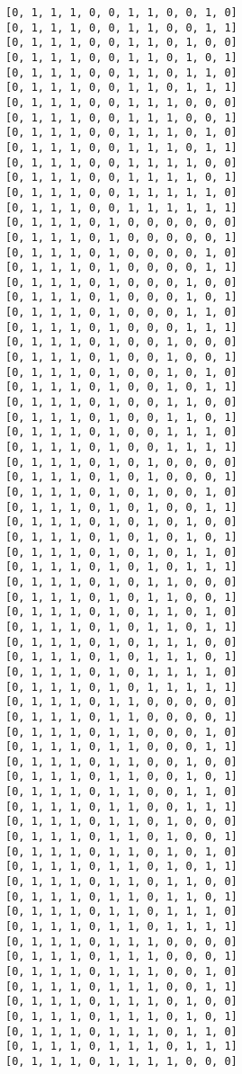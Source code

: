 \documentclass[11pt]{article}
\begin{document}
\begin{Verbatim}[commandchars=\\\{\}]
[0, 1, 1, 1, 0, 0, 1, 1, 0, 0, 1, 0]
[0, 1, 1, 1, 0, 0, 1, 1, 0, 0, 1, 1]
[0, 1, 1, 1, 0, 0, 1, 1, 0, 1, 0, 0]
[0, 1, 1, 1, 0, 0, 1, 1, 0, 1, 0, 1]
[0, 1, 1, 1, 0, 0, 1, 1, 0, 1, 1, 0]
[0, 1, 1, 1, 0, 0, 1, 1, 0, 1, 1, 1]
[0, 1, 1, 1, 0, 0, 1, 1, 1, 0, 0, 0]
[0, 1, 1, 1, 0, 0, 1, 1, 1, 0, 0, 1]
[0, 1, 1, 1, 0, 0, 1, 1, 1, 0, 1, 0]
[0, 1, 1, 1, 0, 0, 1, 1, 1, 0, 1, 1]
[0, 1, 1, 1, 0, 0, 1, 1, 1, 1, 0, 0]
[0, 1, 1, 1, 0, 0, 1, 1, 1, 1, 0, 1]
[0, 1, 1, 1, 0, 0, 1, 1, 1, 1, 1, 0]
[0, 1, 1, 1, 0, 0, 1, 1, 1, 1, 1, 1]
[0, 1, 1, 1, 0, 1, 0, 0, 0, 0, 0, 0]
[0, 1, 1, 1, 0, 1, 0, 0, 0, 0, 0, 1]
[0, 1, 1, 1, 0, 1, 0, 0, 0, 0, 1, 0]
[0, 1, 1, 1, 0, 1, 0, 0, 0, 0, 1, 1]
[0, 1, 1, 1, 0, 1, 0, 0, 0, 1, 0, 0]
[0, 1, 1, 1, 0, 1, 0, 0, 0, 1, 0, 1]
[0, 1, 1, 1, 0, 1, 0, 0, 0, 1, 1, 0]
[0, 1, 1, 1, 0, 1, 0, 0, 0, 1, 1, 1]
[0, 1, 1, 1, 0, 1, 0, 0, 1, 0, 0, 0]
[0, 1, 1, 1, 0, 1, 0, 0, 1, 0, 0, 1]
[0, 1, 1, 1, 0, 1, 0, 0, 1, 0, 1, 0]
[0, 1, 1, 1, 0, 1, 0, 0, 1, 0, 1, 1]
[0, 1, 1, 1, 0, 1, 0, 0, 1, 1, 0, 0]
[0, 1, 1, 1, 0, 1, 0, 0, 1, 1, 0, 1]
[0, 1, 1, 1, 0, 1, 0, 0, 1, 1, 1, 0]
[0, 1, 1, 1, 0, 1, 0, 0, 1, 1, 1, 1]
[0, 1, 1, 1, 0, 1, 0, 1, 0, 0, 0, 0]
[0, 1, 1, 1, 0, 1, 0, 1, 0, 0, 0, 1]
[0, 1, 1, 1, 0, 1, 0, 1, 0, 0, 1, 0]
[0, 1, 1, 1, 0, 1, 0, 1, 0, 0, 1, 1]
[0, 1, 1, 1, 0, 1, 0, 1, 0, 1, 0, 0]
[0, 1, 1, 1, 0, 1, 0, 1, 0, 1, 0, 1]
[0, 1, 1, 1, 0, 1, 0, 1, 0, 1, 1, 0]
[0, 1, 1, 1, 0, 1, 0, 1, 0, 1, 1, 1]
[0, 1, 1, 1, 0, 1, 0, 1, 1, 0, 0, 0]
[0, 1, 1, 1, 0, 1, 0, 1, 1, 0, 0, 1]
[0, 1, 1, 1, 0, 1, 0, 1, 1, 0, 1, 0]
[0, 1, 1, 1, 0, 1, 0, 1, 1, 0, 1, 1]
[0, 1, 1, 1, 0, 1, 0, 1, 1, 1, 0, 0]
[0, 1, 1, 1, 0, 1, 0, 1, 1, 1, 0, 1]
[0, 1, 1, 1, 0, 1, 0, 1, 1, 1, 1, 0]
[0, 1, 1, 1, 0, 1, 0, 1, 1, 1, 1, 1]
[0, 1, 1, 1, 0, 1, 1, 0, 0, 0, 0, 0]
[0, 1, 1, 1, 0, 1, 1, 0, 0, 0, 0, 1]
[0, 1, 1, 1, 0, 1, 1, 0, 0, 0, 1, 0]
[0, 1, 1, 1, 0, 1, 1, 0, 0, 0, 1, 1]
[0, 1, 1, 1, 0, 1, 1, 0, 0, 1, 0, 0]
[0, 1, 1, 1, 0, 1, 1, 0, 0, 1, 0, 1]
[0, 1, 1, 1, 0, 1, 1, 0, 0, 1, 1, 0]
[0, 1, 1, 1, 0, 1, 1, 0, 0, 1, 1, 1]
[0, 1, 1, 1, 0, 1, 1, 0, 1, 0, 0, 0]
[0, 1, 1, 1, 0, 1, 1, 0, 1, 0, 0, 1]
[0, 1, 1, 1, 0, 1, 1, 0, 1, 0, 1, 0]
[0, 1, 1, 1, 0, 1, 1, 0, 1, 0, 1, 1]
[0, 1, 1, 1, 0, 1, 1, 0, 1, 1, 0, 0]
[0, 1, 1, 1, 0, 1, 1, 0, 1, 1, 0, 1]
[0, 1, 1, 1, 0, 1, 1, 0, 1, 1, 1, 0]
[0, 1, 1, 1, 0, 1, 1, 0, 1, 1, 1, 1]
[0, 1, 1, 1, 0, 1, 1, 1, 0, 0, 0, 0]
[0, 1, 1, 1, 0, 1, 1, 1, 0, 0, 0, 1]
[0, 1, 1, 1, 0, 1, 1, 1, 0, 0, 1, 0]
[0, 1, 1, 1, 0, 1, 1, 1, 0, 0, 1, 1]
[0, 1, 1, 1, 0, 1, 1, 1, 0, 1, 0, 0]
[0, 1, 1, 1, 0, 1, 1, 1, 0, 1, 0, 1]
[0, 1, 1, 1, 0, 1, 1, 1, 0, 1, 1, 0]
[0, 1, 1, 1, 0, 1, 1, 1, 0, 1, 1, 1]
[0, 1, 1, 1, 0, 1, 1, 1, 1, 0, 0, 0]

\end{Verbatim}
\end{document}
